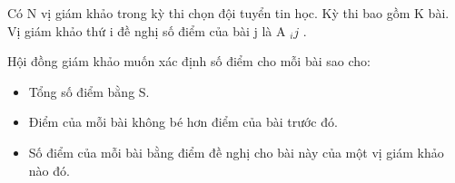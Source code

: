 Có N vị giám khảo trong kỳ thi chọn đội tuyển tin học. Kỳ thi bao gồm K bài. Vị giám khảo thứ i đề nghị số điểm của bài j là A $_ ij $ .

Hội đồng giám khảo muốn xác định số điểm cho mỗi bài sao cho:
\begin{itemize}
	\item Tổng số điểm bằng S.
	\item Điểm của mỗi bài không bé hơn điểm của bài trước đó.
	\item Số điểm của mỗi bài bằng điểm đề nghị cho bài này của một vị giám khảo nào đó.
\end{itemize}